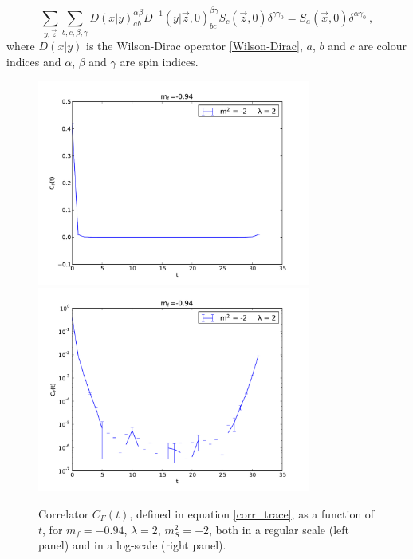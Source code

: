 \begin{equation}
\sum_{y,\vec z} \sum_{b,c,\beta, \gamma} D(x \vert y)_{a b}^{\alpha \beta}D^{-1}(y \vert \vec z, 0)_{b c}^{\beta \gamma} S_c(\vec z,0) \delta^{\gamma \gamma_0} = S_a(\vec x,0)\delta^{\alpha \gamma_0} \: ,
\end{equation}
%
where $D(x \vert y)$ is the Wilson-Dirac operator \ref{Wilson-Dirac}, $a$, $b$ and $c$ are colour indices and $\alpha$, $\beta$ and $\gamma$ are spin indices.

\begin{figure}[thb] 
\begin{adjustwidth}{-4em}{-4em}
  \includegraphics[width=9cm,clip]{pics/spectrum_trace}\includegraphics[width=9cm,clip]{pics/spectrum_trace_log}
\end{adjustwidth}
  \caption{Correlator $C_F(t)$, defined in equation \ref{corr_trace}, as a function of $t$, for $m_f = -0.94$, $\lambda = 2$, $m_S^2 = -2$, both in a regular scale (left panel) and in a log-scale (right panel).}
  \label{spectrum_trace}
\end{figure}



